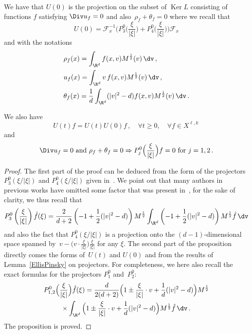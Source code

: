 \begin{prop}
We have that $U(0)$ is the projection on the subset of $\operatorname{Ker} L$ consisting of functions $f$ satisfying $\Div u_f = 0$ and also~$\rho_f+ \theta_f = 0$ where we recall that
\begin{equation}\label{formulaU(0}
U(0) =\mathcal{F}_x^{-1} \bigg(P_{3}^0\Big(\frac{\xi}{|\xi|}\Big) + P_{4}^0\Big(\frac{\xi}{|\xi|}\Big)\bigg) \mathcal{F}_x
\end{equation}
and with the notations
\begin{align*}
&\rho_{f}(x)= \int_{\R^d} f (x,v)M^\frac12 (v) \, \dv \,,\\
&u_{f} (x)= \int_{\R^d} v\, f (x,v)M^\frac12 (v) \, \dv\,, \\
&\theta_{f} (x)= \frac{1}{d} \int_{\R^d} (|v|^2-d) f (x,v)M^\frac12 (v) \, \dv \,.
\end{align*}

We also have
\begin{equation}\label{U(t)U(0}
U(t) f = U(t) U(0) f \,, \quad \forall t \ge 0, \quad \forall f \in X^{\ell,k} \,
\end{equation}
and
\begin{equation}\label{P012}
\Div u_f = 0 \text{ and } \rho_f+ \theta_f = 0 \Rightarrow P_{j}^0\Big(\frac{\xi}{|\xi|}\Big) f =0 \text{ for } j=1,2 \,.
\end{equation}
\end{prop}

\begin{proof}
The first part of the proof can be deduced from the form of the projectors~$P_3^0(\xi/|\xi|)$ and $P_4^0(\xi/|\xi|)$ given in~\cite{Ellis-Pinsky}. We point out that many authors in previous works have omitted some factor that was present in~\cite{Ellis-Pinsky}, for the sake of clarity, we thus recall that
\[
P_{3}^0\left(\frac{\xi}{|\xi|}\right) \hat f (\xi) = \frac{2}{d+2} \left(-1+ \frac 12 (|v|^2-d)\right) M^\frac12 \int_{\R^d} \left(-1+ \frac 12 (|v|^2-d)\right) M^{\frac12} \hat f \, \dv
\]
and also the fact that $P_4^0(\xi/|\xi|)$ is a projection onto the $(d-1)$-dimensional space spanned by~$v-\big(v \cdot \frac{\xi}{|\xi|}\big) \frac{\xi}{|\xi|}$ for any $\xi$. The second part of the proposition directly comes the forms of~$U(t)$ and $U(0)$ and from the results of Lemma~\ref{EllisPinsky} on projectors. For completeness, we here also recall the exact formulas for the projectors $P_1^0$ and~$P^0_2$:%
\begin{multline*}
P_{1,2}^0\Big(\frac{\xi}{|\xi|}\Big) \hat f (\xi)= \frac{d}{2(d+2)} \Big(1 \pm \frac{\xi}{|\xi|} \cdot v + \frac 1d (|v|^2-d)\Big) M^\frac12 \\
\times\int_{\R^d} \Big(1 \pm \frac{\xi}{|\xi|} \cdot v + \frac 1d (|v|^2-d)\Big) M^{\frac12} \hat f \, \dv \,.
\end{multline*}
%
The proposition is proved.
\end{proof}

